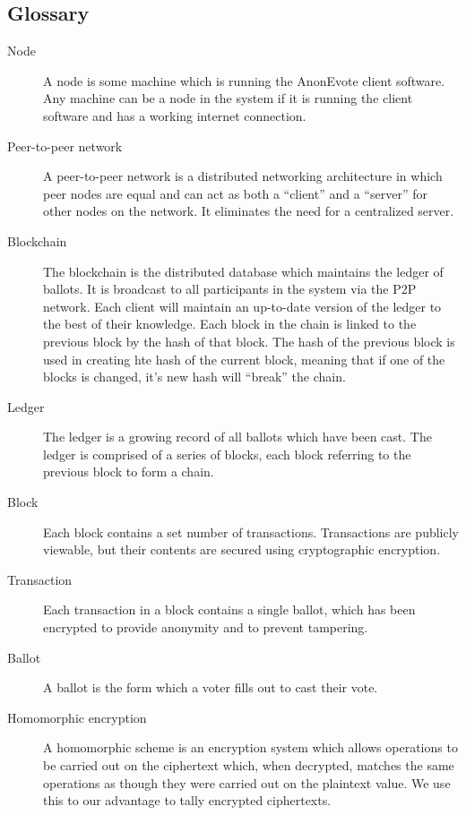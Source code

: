 \documentclass[a4paper,12pt]{article}
\newcommand{\proj}{AnonEvote}
\begin{document}
\subsection{Glossary}
\begin{description}

    \item[Node]
        A node is some machine which is running the \proj{} client software. Any machine can be a node in the system if it is running the client software and has a working internet connection.

    \item[Peer-to-peer network]
        A peer-to-peer network is a distributed networking architecture in which peer nodes are equal and can act as both a ``client'' and a ``server'' for other nodes on the network. It eliminates the need for a centralized server.

	\item[Blockchain]
		The blockchain is the distributed database which maintains the ledger of ballots. It is broadcast to all participants in the system via the P2P network. Each client will maintain an up-to-date version of the ledger to the best of their knowledge. Each block in the chain is linked to the previous block by the hash of that block. The hash of the previous block is used in creating hte hash of the current block, meaning that if one of the blocks is changed, it's new hash will ``break'' the chain.

	\item[Ledger]
		The ledger is a growing record of all ballots which have been cast. The ledger is comprised of a series of blocks, each block referring to the previous block to form a chain.

    \item[Block]
        Each block contains a set number of transactions. Transactions are publicly viewable, but their contents are secured using cryptographic encryption.

	\item[Transaction]
		Each transaction in a block contains a single ballot, which has been encrypted to provide anonymity and to prevent tampering.

    \item[Ballot]
        A ballot is the form which a voter fills out to cast their vote.

    \item[Homomorphic encryption]
        A homomorphic scheme is an encryption system which allows operations to be carried out on the ciphertext which, when decrypted, matches the same operations as though they were carried out on the plaintext value. We use this to our advantage to tally encrypted ciphertexts.


\end{description}
\end{document}
